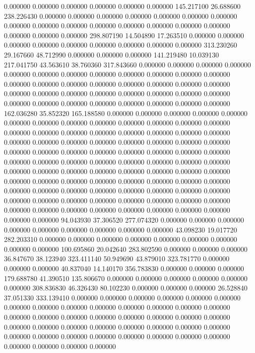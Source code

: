 0.000000 0.000000 0.000000
0.000000 0.000000 0.000000
145.217100 26.688600 238.226430
0.000000 0.000000 0.000000
0.000000 0.000000 0.000000
0.000000 0.000000 0.000000
0.000000 0.000000 0.000000
0.000000 0.000000 0.000000
0.000000 0.000000 0.000000
298.807190 14.504890 17.263510
0.000000 0.000000 0.000000
0.000000 0.000000 0.000000
0.000000 0.000000 0.000000
313.230260 29.167660 48.712990
0.000000 0.000000 0.000000
141.219480 10.039130 217.041750
43.563610 38.760360 317.843660
0.000000 0.000000 0.000000
0.000000 0.000000 0.000000
0.000000 0.000000 0.000000
0.000000 0.000000 0.000000
0.000000 0.000000 0.000000
0.000000 0.000000 0.000000
0.000000 0.000000 0.000000
0.000000 0.000000 0.000000
0.000000 0.000000 0.000000
0.000000 0.000000 0.000000
0.000000 0.000000 0.000000
0.000000 0.000000 0.000000
162.036280 35.852320 165.188580
0.000000 0.000000 0.000000
0.000000 0.000000 0.000000
0.000000 0.000000 0.000000
0.000000 0.000000 0.000000
0.000000 0.000000 0.000000
0.000000 0.000000 0.000000
0.000000 0.000000 0.000000
0.000000 0.000000 0.000000
0.000000 0.000000 0.000000
0.000000 0.000000 0.000000
0.000000 0.000000 0.000000
0.000000 0.000000 0.000000
0.000000 0.000000 0.000000
0.000000 0.000000 0.000000
0.000000 0.000000 0.000000
0.000000 0.000000 0.000000
0.000000 0.000000 0.000000
0.000000 0.000000 0.000000
0.000000 0.000000 0.000000
0.000000 0.000000 0.000000
0.000000 0.000000 0.000000
0.000000 0.000000 0.000000
0.000000 0.000000 0.000000
0.000000 0.000000 0.000000
0.000000 0.000000 0.000000
0.000000 0.000000 0.000000
0.000000 0.000000 0.000000
0.000000 0.000000 0.000000
0.000000 0.000000 0.000000
94.043930 37.306520 277.074320
0.000000 0.000000 0.000000
0.000000 0.000000 0.000000
0.000000 0.000000 0.000000
43.098230 19.017720 282.203310
0.000000 0.000000 0.000000
0.000000 0.000000 0.000000
0.000000 0.000000 0.000000
100.695860 20.042640 283.802590
0.000000 0.000000 0.000000
36.847670 38.123940 323.411140
50.949690 43.879010 323.781770
0.000000 0.000000 0.000000
40.837040 14.140170 356.783830
0.000000 0.000000 0.000000
179.688780 41.390510 135.806670
0.000000 0.000000 0.000000
0.000000 0.000000 0.000000
308.836830 46.326430 80.102230
0.000000 0.000000 0.000000
26.528840 37.051330 333.139410
0.000000 0.000000 0.000000
0.000000 0.000000 0.000000
0.000000 0.000000 0.000000
0.000000 0.000000 0.000000
0.000000 0.000000 0.000000
0.000000 0.000000 0.000000
0.000000 0.000000 0.000000
0.000000 0.000000 0.000000
0.000000 0.000000 0.000000
0.000000 0.000000 0.000000
0.000000 0.000000 0.000000
0.000000 0.000000 0.000000
0.000000 0.000000 0.000000
0.000000 0.000000 0.000000
